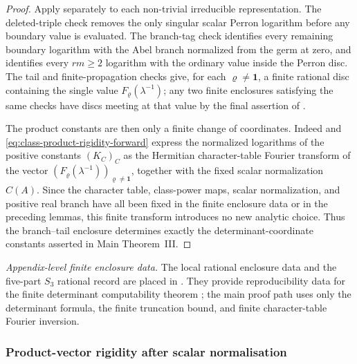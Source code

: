 \documentclass[11pt,a4paper]{amsart}
\theoremstyle{plain}
\theoremstyle{definition}
\theoremstyle{remark}
\begin{document}
\begin{proof}
  Apply  separately to each
  non-trivial irreducible representation.  The deleted-triple check removes the
  only singular scalar Perron logarithm before any boundary value is evaluated.
  The branch-tag check identifies every remaining boundary logarithm with the
  Abel branch normalized from the germ at zero, and identifies every
  \(rm\ge2\) logarithm with the ordinary value inside the Perron disc.  The
  tail and finite-propagation checks give, for each \(\varrho\ne\mathbf1\), a
  finite rational disc containing the single value
  \(F_\varrho(\lambda^{-1})\); any two finite enclosures satisfying the same checks have
  discs meeting at that value by the final assertion of
  .

  The product constants are then only a finite change of coordinates.  Indeed
   and
  \eqref{eq:class-product-rigidity-forward} express the normalized logarithms
  of the positive constants \((K_C)_C\) as the Hermitian character-table Fourier
  transform of the vector
  \((F_\varrho(\lambda^{-1}))_{\varrho\ne\mathbf1}\), together with the fixed
  scalar normalization \(C(A)\).  Since the character table, class-power maps,
  scalar normalization, and positive real branch have all been fixed in the
  finite enclosure data or in the preceding lemmas, this finite transform
  introduces no new analytic choice.  Thus the branch--tail enclosure determines
  exactly the determinant-coordinate constants asserted in Main Theorem~III.
\end{proof}

\medskip
\noindent\textit{Appendix-level finite enclosure data.}
  The local rational enclosure data and the five-part \(S_3\) rational
  record are placed in
  .
  They provide reproducibility data for the finite determinant computability
  theorem ; the main proof path
  uses only the determinant formula, the finite truncation bound, and finite
  character-table Fourier inversion.


\subsubsection{Product-vector rigidity after scalar normalisation}
\label{subsubsec:class-product-vector-rigidity}
\end{document}
